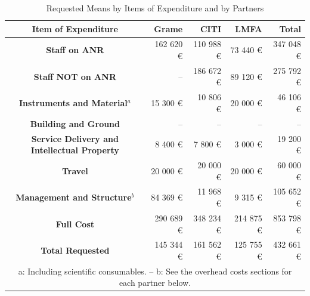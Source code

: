 \documentclass[a4paper,9pt]{extarticle}
\begin{document}
\begin{table}
\begin{center}
\begin{tabular}{c | r r r | r}
\textbf{Item of Expenditure} & \textbf{Grame} & \textbf{CITI} & \textbf{LMFA} & \textbf{Total}\\
\hline
\hline
\textbf{Staff on ANR} & 162 620 \euro{} & 110 988 \euro{} & 73 440 \euro{} & 347 048 \euro{} \\
\textbf{Staff NOT on ANR} & -- & 186 672 \euro{} & 89 120 \euro{} & 275 792 \euro{} \\
\textbf{Instruments and Material$^a$} & 15 300 \euro{} & 10 806 \euro{} & 20 000 \euro{} & 46 106 \euro{} \\
\textbf{Building and Ground} & -- & -- & -- & -- \\
\textbf{Service Delivery and Intellectual Property} & 8 400 \euro{} & 7 800 \euro{} & 3 000 \euro{} & 19 200 \euro{} \\
\textbf{Travel} & 20 000 \euro{} & 20 000 \euro{} & 20 000 \euro{} & 60 000 \euro{}\\
\textbf{Management and Structure}$^b$ & 84 369 \euro{} & 11 968 \euro{} &9 315 \euro{} & 105 652 \euro{} \\
\textbf{Full Cost} & 290 689 \euro{} & 348 234 \euro{} & 214 875 \euro{} & 853 798 \euro{} \\
\hline
\textbf{Total Requested} & 145 344 \euro{} & 161 562 \euro{} & 125 755 \euro{} & 432 661 \euro{} \\
\hline
\multicolumn{5}{p{14cm}}{a: Including scientific consumables. -- b: See the overhead costs sections for each partner below.}
\end{tabular}
\end{center}
\caption{Requested Means by Items of Expenditure and by Partners}
\label{tab:exp}
\end{table}
\end{document}
